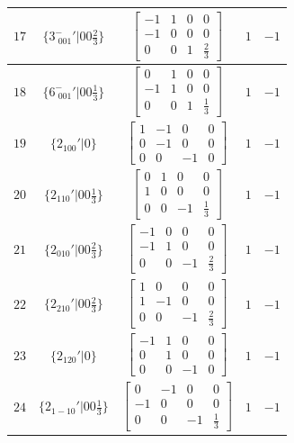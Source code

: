 \documentclass[fleqn,8pt]{jsarticle}
\begin{document}
\begin{longtable}{ccccc}
$ 17 $ & $ \{3^{-}_{\,\,001}{}'|0 0 \frac{2}{3}\} $ & $ \begin{bmatrix} -1 & 1 & 0 & 0 \\ -1 & 0 & 0 & 0 \\ 0 & 0 & 1 & \frac{2}{3} \end{bmatrix} $ & $ 1 $ & $ -1 $ \\ \hline
$ 18 $ & $ \{6^{-}_{\,\,001}{}'|0 0 \frac{1}{3}\} $ & $ \begin{bmatrix} 0 & 1 & 0 & 0 \\ -1 & 1 & 0 & 0 \\ 0 & 0 & 1 & \frac{1}{3} \end{bmatrix} $ & $ 1 $ & $ -1 $ \\ \hline
$ 19 $ & $ \{2{}_{100}{}'|0\} $ & $ \begin{bmatrix} 1 & -1 & 0 & 0 \\ 0 & -1 & 0 & 0 \\ 0 & 0 & -1 & 0 \end{bmatrix} $ & $ 1 $ & $ -1 $ \\ \hline
$ 20 $ & $ \{2{}_{110}{}'|0 0 \frac{1}{3}\} $ & $ \begin{bmatrix} 0 & 1 & 0 & 0 \\ 1 & 0 & 0 & 0 \\ 0 & 0 & -1 & \frac{1}{3} \end{bmatrix} $ & $ 1 $ & $ -1 $ \\ \hline
$ 21 $ & $ \{2{}_{010}{}'|0 0 \frac{2}{3}\} $ & $ \begin{bmatrix} -1 & 0 & 0 & 0 \\ -1 & 1 & 0 & 0 \\ 0 & 0 & -1 & \frac{2}{3} \end{bmatrix} $ & $ 1 $ & $ -1 $ \\ \hline
$ 22 $ & $ \{2{}_{210}{}'|0 0 \frac{2}{3}\} $ & $ \begin{bmatrix} 1 & 0 & 0 & 0 \\ 1 & -1 & 0 & 0 \\ 0 & 0 & -1 & \frac{2}{3} \end{bmatrix} $ & $ 1 $ & $ -1 $ \\ \hline
$ 23 $ & $ \{2{}_{120}{}'|0\} $ & $ \begin{bmatrix} -1 & 1 & 0 & 0 \\ 0 & 1 & 0 & 0 \\ 0 & 0 & -1 & 0 \end{bmatrix} $ & $ 1 $ & $ -1 $ \\ \hline
$ 24 $ & $ \{2{}_{1-10}{}'|0 0 \frac{1}{3}\} $ & $ \begin{bmatrix} 0 & -1 & 0 & 0 \\ -1 & 0 & 0 & 0 \\ 0 & 0 & -1 & \frac{1}{3} \end{bmatrix} $ & $ 1 $ & $ -1 $ \\
\end{longtable}
\end{document}
